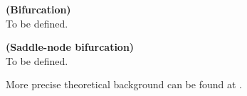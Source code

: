 \begin{definition} \textbf{(Bifurcation)} \\
    \label{def:bifurcation}
    To be defined.
\end{definition}

\begin{definition} \textbf{(Saddle-node bifurcation)} \\
    \label{def:saddle_node_bif}
    To be defined.
\end{definition}

More precise theoretical background can be found at \cite{Devaney20211026,Elaskar2017,Lynch2014}.

\endinput